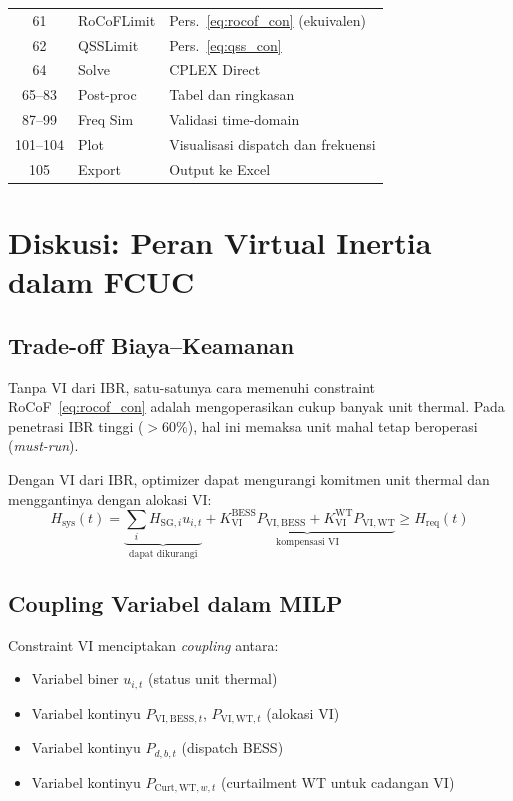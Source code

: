 \documentclass[journal]{IEEEtran}
\newcommand{\Hsys}{H_{\mathrm{sys}}}
\begin{document}
\begin{table}[!t]
\begin{tabular}{clp{4.8cm}}
61 & RoCoFLimit   & Pers.~\eqref{eq:rocof_con} (ekuivalen) \\
62 & QSSLimit     & Pers.~\eqref{eq:qss_con} \\
64 & Solve        & CPLEX Direct \\
65--83 & Post-proc  & Tabel dan ringkasan \\
87--99 & Freq Sim  & Validasi time-domain \\
101--104 & Plot    & Visualisasi dispatch dan frekuensi \\
105 & Export       & Output ke Excel \\
\bottomrule
\end{tabular}
\end{table}

\section{Diskusi: Peran Virtual Inertia dalam FCUC}
\label{sec:discussion}

\subsection{Trade-off Biaya--Keamanan}

Tanpa VI dari IBR, satu-satunya cara memenuhi constraint
RoCoF~\eqref{eq:rocof_con} adalah mengoperasikan cukup
banyak unit thermal. Pada penetrasi IBR tinggi ($>60\%$),
hal ini memaksa unit mahal tetap beroperasi
(\textit{must-run}).

Dengan VI dari IBR, optimizer dapat mengurangi komitmen
unit thermal dan menggantinya dengan alokasi VI:
\begin{equation}
  \Hsys(t) =
    \underbrace{\sum_i H_{\mathrm{SG},i} u_{i,t}}_{\text{dapat dikurangi}}
    + \underbrace{K_{\mathrm{VI}}^{\mathrm{BESS}} P_{\mathrm{VI,BESS}}
      + K_{\mathrm{VI}}^{\mathrm{WT}} P_{\mathrm{VI,WT}}}_{\text{kompensasi VI}}
  \geq H_{\mathrm{req}}(t)
  \label{eq:tradeoff}
\end{equation}

\subsection{Coupling Variabel dalam MILP}

Constraint VI menciptakan \textit{coupling} antara:
\begin{itemize}
  \item Variabel biner $u_{i,t}$ (status unit thermal)
  \item Variabel kontinyu $P_{\mathrm{VI,BESS},t}$,
    $P_{\mathrm{VI,WT},t}$ (alokasi VI)
  \item Variabel kontinyu $P_{d,b,t}$ (dispatch BESS)
  \item Variabel kontinyu $P_{\mathrm{Curt,WT},w,t}$
    (curtailment WT untuk cadangan VI)
\end{itemize}
\end{document}
